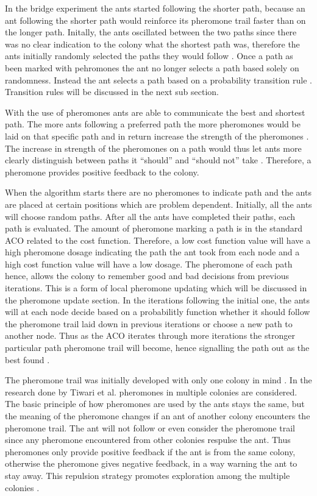 In the bridge experiment the ants started following the shorter path, because an ant following the shorter path would reinforce its pheromone trail faster than on the longer path. Initally, the ants oscillated between the two paths since there was no clear indication to the colony what the shortest path was, therefore the ants initially randomly selected the paths they would follow \cite{AntQAP}. Once a path as been marked with pehromones the ant no longer selects a path based solely on randomness. Instead the ant selects a path based on a probability transition rule \cite{AntsAndStigmergy}. Transition rules will be discussed in the next sub section.

With the use of pheromones ants are able to communicate the best and shortest path. The more ants following a preferred path the more pheromones would be laid on that specific path and in return increase the strength of the pheromones \cite{ImpACOComplex}. The increase in strength of the pheromones on a path would thus let ants more clearly distinguish between paths it “should” and “should not” take \cite{ImpACOComplex}. Therefore, a pheromone provides positive feedback to the colony.

When the algorithm starts there are no pheromones to indicate path and the ants are placed at certain positions which are problem dependent. Initially, all the ants will choose random paths. After all the ants have completed their paths, each path is evaluated\cite{CompuIntelligenceIntro}. The amount of pheromone marking a path is in the standard ACO related to the cost function. Therefore, a low cost function value will have a high pheromone dosage indicating the path the ant took from each node and a high cost function value will have a low dosage\cite{CompuIntelligenceIntro}. The pheromone of each path hence, allows the colony to remember good and bad decisions from previous iterations\cite{CompuIntelligenceIntro}. This is a form of local pheromone updating \label{def:localpheromoneupdate}which will be discussed in the pheromone update section. In the iterations following the initial one, the ants will at each node decide based on a probabilitly function whether it should follow the pheromone trail laid down in previous iterations or choose a new path to another node. Thus as the ACO iterates through more iterations the stronger particular path pheromone trail will become, hence signalling the path out as the best found \cite{CompuIntelligenceIntro}.

The pheromone trail was initially developed with only one colony in mind \cite{CompuIntelligenceIntro}. In the research done by Tiwari et al. pheromones in multiple colonies are considered. The basic principle of how pheromones are used by the ants stays the same, but the meaning of the pheromone changes if an ant of another colony encounters the pheromone trail. The ant will not follow or even consider the pheromone trail since any pheromone encountered from other colonies respulse the ant. Thus pheromones only provide positive feedback if the ant is from the same colony, otherwise the pheromone gives negative feedback, in a way warning the ant to stay away. This repulsion strategy promotes exploration among the multiple colonies  \cite{ACOLargeProblem}.

